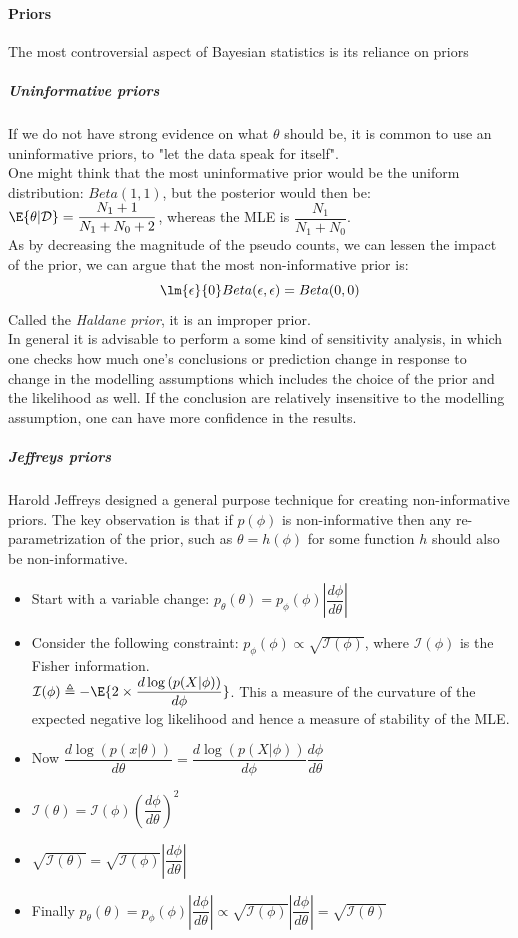 \paragraph{Priors}
The most controversial aspect of Bayesian statistics is its reliance on priors
\subparagraph{Uninformative priors}
If we do not have strong evidence on what $\theta$ should be, it is common to use an
uninformative priors, to "let the data speak for itself".\\
One might think that the most uninformative prior would be the uniform distribution: 
$Beta(1, 1)$, but the posterior would then be: $\E{\theta|\mathcal{D}} =
\dfrac{N_{1}+1}{N_{1}+N_{0}+2}$, whereas the MLE is $\dfrac{N_{1}}{N_{1}+N_{0}}$.\\
As by decreasing the magnitude of the pseudo counts, we can lessen the impact of the 
prior, we can argue that the most non-informative prior is: 
$$\lm{\epsilon}{0} Beta(\epsilon, \epsilon) = Beta(0, 0)$$
Called the \emph{Haldane prior}, it is an improper prior.\\
In general it is advisable to perform a some kind of sensitivity analysis, in which one
checks how much one's conclusions or prediction change in response to change in the 
modelling assumptions which includes the choice of the prior and the likelihood as well.
If the conclusion are relatively insensitive to the modelling assumption, one can have
more confidence in the results.
\subparagraph{Jeffreys priors}
Harold Jeffreys designed a general purpose technique for creating non-informative priors.
The key observation is that if $p(\phi)$ is non-informative then any re-parametrization
of the prior, such as $\theta=h(\phi)$ for some function $h$ should also be 
non-informative.
\begin{itemize}
	\item Start with a variable change: $p_{\theta}(\theta) = p_{\phi}(\phi)\left|\dfrac{d\phi}{d\theta}\right|$
	\item Consider the following constraint: $p_{\phi}(\phi)\propto
		\sqrt{\mathcal{I}(\phi)}$, where $\mathcal{I}(\phi)$ is the Fisher 
		information.\\ $\mathcal{I}(\phi) \triangleq - \E{2 \times 
		\dfrac{d\log\left(p(X|\phi)\right)}{d\phi}}$. This a measure of the
		curvature of the expected negative log likelihood and hence a measure of
		stability of the MLE.
	\item Now $\dfrac{d\log(p(x|\theta))}{d\theta} = 
		\dfrac{d\log(p(X|\phi))}{d\phi}\dfrac{d\phi}{d\theta}$
	\item $\mathcal{I}(\theta) = \mathcal{I}(\phi)
		\left(\dfrac{d\phi}{d\theta}\right)^{2}$
	\item $\sqrt{\mathcal{I}(\theta)} = \sqrt{\mathcal{I}(\phi)}\left|\dfrac{d\phi}
		{d\theta}\right|$
	\item Finally $p_{\theta}(\theta) = p_{\phi}(\phi)\left|\dfrac{d\phi}
		{d\theta}\right| \propto \sqrt{\mathcal{I}(\phi)}\left|\dfrac{d\phi}
		{d\theta}\right| = \sqrt{\mathcal{I}(\theta)}$
\end{itemize}

